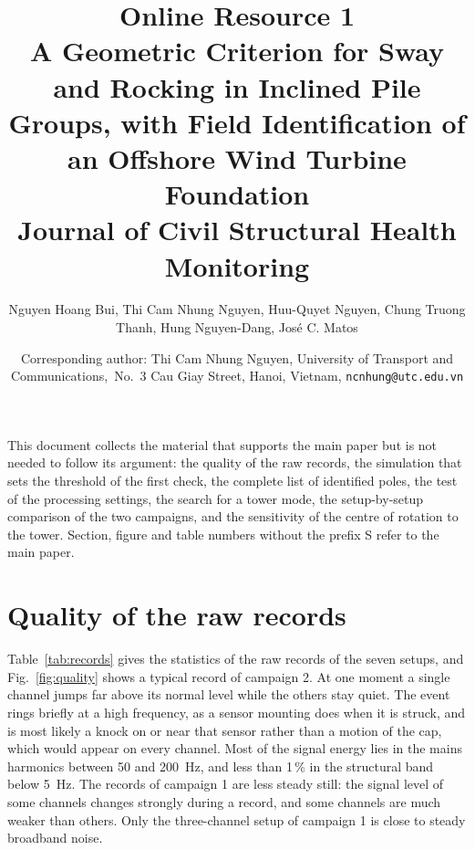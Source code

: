 \documentclass[11pt]{article}
\title{Online Resource 1\\[4pt]
\large A Geometric Criterion for Sway and Rocking in Inclined Pile Groups, with Field Identification of an Offshore Wind Turbine Foundation\\[6pt]
\normalsize Journal of Civil Structural Health Monitoring}
\author{Nguyen Hoang Bui, Thi Cam Nhung Nguyen, Huu-Quyet Nguyen, Chung Truong Thanh, Hung Nguyen-Dang, Jos\'e C. Matos}
\date{\small Corresponding author: Thi Cam Nhung Nguyen, University of Transport and Communications,\ No.\ 3 Cau Giay Street, Hanoi, Vietnam, \texttt{ncnhung@utc.edu.vn}}
\begin{document}
\maketitle

\noindent This document collects the material that supports the main paper but
is not needed to follow its argument: the quality of the raw records, the
simulation that sets the threshold of the first check, the complete list of
identified poles, the test of the processing settings, the search for a tower
mode, the setup-by-setup comparison of the two campaigns, and the sensitivity
of the centre of rotation to the tower. Section, figure and
table numbers without the prefix S refer to the main paper.

\section{Quality of the raw records}
\label{sec:s-quality}

Table~\ref{tab:records} gives the statistics of the raw records of the seven
setups, and Fig.~\ref{fig:quality} shows a typical record of campaign 2. At
one moment a single channel jumps far above its normal level while the others
stay quiet. The event rings briefly at a high frequency, as a sensor mounting
does when it is struck, and is most likely a knock on or near that sensor
rather than a motion of the cap, which would appear on every channel. Most of
the signal energy lies in the mains harmonics between 50 and 200~Hz, and less
than 1\,\% in the structural band below 5~Hz. The records of campaign 1 are
less steady still: the signal level of some channels changes strongly during a
record, and some channels are much weaker than others. Only the three-channel
setup of campaign 1 is close to steady broadband noise.
\end{document}

